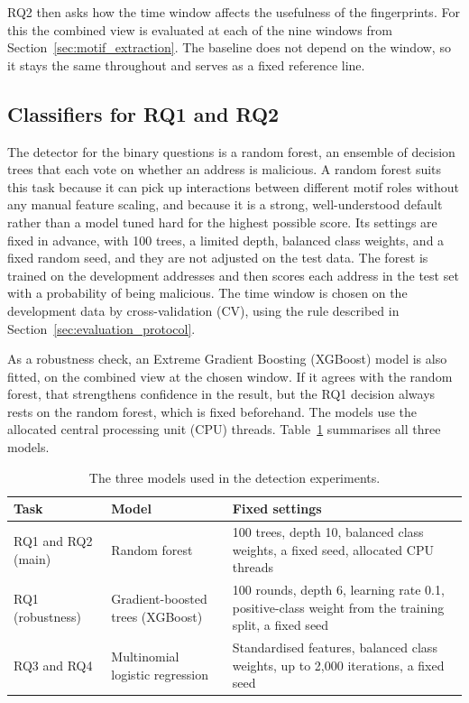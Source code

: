 RQ2 then asks how the time window affects the usefulness of the fingerprints.
For this the
combined view is evaluated at each of the nine windows from
Section~\ref{sec:motif_extraction}. The baseline does not depend on the window, so
it stays the same throughout and serves as a fixed reference line.

\subsection{Classifiers for RQ1 and RQ2}

The detector for the binary questions is a random forest, an ensemble of decision
trees that each vote on whether an address is malicious. A random forest suits
this task because it can pick up interactions between different motif roles
without any manual feature scaling, and because it is a strong, well-understood
default rather than a model tuned hard for the highest possible score. Its
settings are fixed in advance, with 100 trees, a limited depth, balanced class
weights, and a fixed random seed, and they are not adjusted on the test data. The
forest is trained on the development addresses and then scores each address in the
test set with a probability of being malicious. The time window is chosen on the
development data by cross-validation (CV), using the rule described in
Section~\ref{sec:evaluation_protocol}.

As a robustness check, an Extreme Gradient Boosting (XGBoost) model is also fitted, on
the combined view at the chosen window. If it agrees with the random forest, that
strengthens confidence in the result, but the RQ1 decision always rests on the
random forest, which is fixed beforehand. The models use the allocated central
processing unit (CPU) threads. Table~\ref{tab:results_models}
summarises all three models.

\begin{table}[ht]
\centering
\caption{The three models used in the detection experiments.}
\label{tab:results_models}
\small
\begin{tabular}{@{}p{2.8cm} p{3.7cm} p{6.6cm}@{}}
\toprule
\textbf{Task} & \textbf{Model} & \textbf{Fixed settings} \\
\midrule
RQ1 and RQ2 (main) &
Random forest &
100 trees, depth 10, balanced class weights, a fixed seed, allocated CPU threads \\[2pt]
RQ1 (robustness) &
Gradient-boosted trees (XGBoost) &
100 rounds, depth 6, learning rate 0.1, positive-class weight from the training
split, a fixed seed \\[2pt]
RQ3 and RQ4 &
Multinomial logistic regression &
Standardised features, balanced class weights, up to 2{,}000 iterations, a fixed
seed \\
\bottomrule
\end{tabular}
\end{table}

